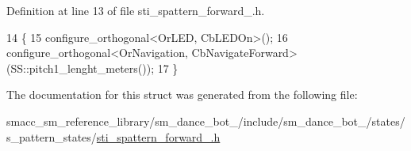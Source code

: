 Definition at line 13 of file sti\+\_\+spattern\+\_\+forward\+\_.\+h.


\begin{DoxyCode}
14   \{
15     configure\_orthogonal<OrLED, CbLEDOn>();
16     configure\_orthogonal<OrNavigation, CbNavigateForward>(SS::pitch1\_lenght\_meters());
17   \}
\end{DoxyCode}


The documentation for this struct was generated from the following file\+:\begin{DoxyCompactItemize}
\item 
smacc\+\_\+sm\+\_\+reference\+\_\+library/sm\+\_\+dance\+\_\+bot\+\_/include/sm\+\_\+dance\+\_\+bot\+\_/states/s\+\_\+pattern\+\_\+states/\hyperlink{3_2include_2sm__dance__bot__3_2states_2s__pattern__states_2sti__spattern__forward__1_8h}{sti\+\_\+spattern\+\_\+forward\+\_.\+h}\end{DoxyCompactItemize}
